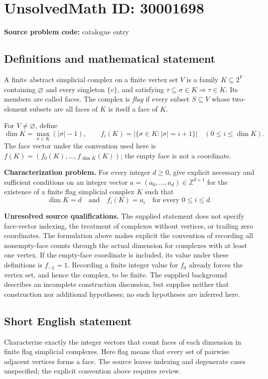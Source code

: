 \documentclass[11pt]{article}
\newcommand{\Z}{\mathbb{Z}}
\begin{document}
\section*{UnsolvedMath ID: 30001698}
\textbf{Source problem code:} catalogue entry
\subsection{Definitions and mathematical statement}
A finite abstract simplicial complex on a finite vertex set \(V\) is a family \(K\subseteq 2^V\) containing \(\varnothing\) and every singleton \(\{v\}\), and satisfying \(\tau\subseteq\sigma\in K\Rightarrow\tau\in K\). Its members are called faces. The complex is \emph{flag} if every subset \(S\subseteq V\) whose two-element subsets are all faces of \(K\) is itself a face of \(K\).

For \(V\ne\varnothing\), define
\[
\dim K=\max_{\sigma\in K}(|\sigma|-1),\qquad
f_i(K)=\bigl|\{\sigma\in K:|\sigma|=i+1\}\bigr|\quad(0\le i\le\dim K).
\]
The face vector under the convention used here is \(f(K)=(f_0(K),\ldots,f_{\dim K}(K))\); the empty face is not a coordinate.

\textbf{Characterization problem.} For every integer \(d\ge0\), give explicit necessary and sufficient conditions on an integer vector \(a=(a_0,\ldots,a_d)\in\Z^{d+1}\) for the existence of a finite flag simplicial complex \(K\) such that
\[
\dim K=d\quad\text{and}\quad f_i(K)=a_i\quad\text{for every }0\le i\le d.
\]

\textbf{Unresolved source qualifications.} The supplied statement does not specify face-vector indexing, the treatment of complexes without vertices, or trailing zero coordinates. The formulation above makes explicit the convention of recording all nonempty-face counts through the actual dimension for complexes with at least one vertex. If the empty-face coordinate is included, its value under these definitions is \(f_{-1}=1\). Recording a finite integer value for \(f_0\) already forces the vertex set, and hence the complex, to be finite. The supplied background describes an incomplete construction discussion, but supplies neither that construction nor additional hypotheses; no such hypotheses are inferred here.
\subsection{Short English statement}
Characterize exactly the integer vectors that count faces of each dimension in finite flag simplicial complexes. Here flag means that every set of pairwise adjacent vertices forms a face. The source leaves indexing and degenerate cases unspecified; the explicit convention above requires review.
\end{document}
